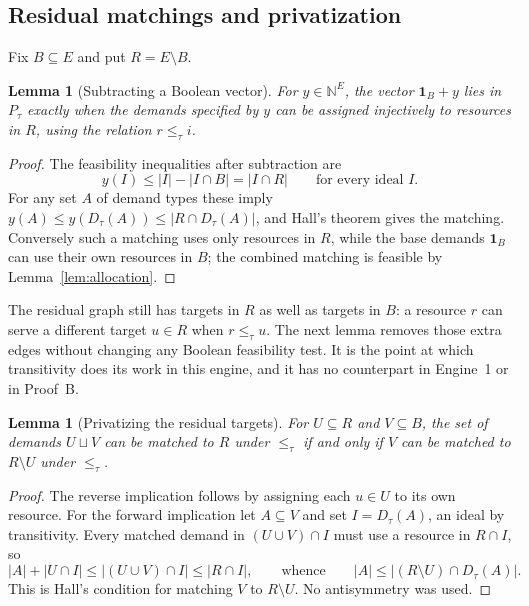\documentclass[11pt]{article}
\numberwithin{equation}{section}
\newtheorem{lemma}[theorem]{Lemma}
\theoremstyle{definition}
\theoremstyle{remark}
\newcommand{\N}{\mathbb N}
\newcommand{\one}{\mathbf 1}
\begin{document}
\subsection{Residual matchings and privatization}

Fix $B\subseteq E$ and put $R=E\setminus B$.

\begin{lemma}[Subtracting a Boolean vector]
\label{lem:residual}
For $y\in\N^E$, the vector $\one_B+y$ lies in $P_\tau$ exactly when the
demands specified by $y$ can be assigned injectively to resources in $R$,
using the relation $r\le_\tau i$.
\end{lemma}

\begin{proof}
The feasibility inequalities after subtraction are
\begin{equation}
 y(I)\le |I|-|I\cap B|=|I\cap R|\qquad\text{for every ideal }I.
 \label{eq:residual-ideal}
\end{equation}
For any set $A$ of demand types these imply
$y(A)\le y(D_\tau(A))\le|R\cap D_\tau(A)|$, and Hall's theorem gives the
matching. Conversely such a matching uses only resources in $R$, while the
base demands $\one_B$ can use their own resources in $B$; the combined
matching is feasible by Lemma~\ref{lem:allocation}.
\end{proof}

The residual graph still has targets in $R$ as well as targets in $B$: a
resource $r$ can serve a different target $u\in R$ when $r\le_\tau u$. The
next lemma removes those extra edges without changing any Boolean feasibility
test. It is the point at which transitivity does its work in this engine, and
it has no counterpart in Engine~1 or in Proof~B.

\begin{lemma}[Privatizing the residual targets]
\label{lem:private}
For $U\subseteq R$ and $V\subseteq B$, the set of demands $U\sqcup V$ can be
matched to $R$ under $\le_\tau$ if and only if $V$ can be matched to
$R\setminus U$ under $\le_\tau$.
\end{lemma}

\begin{proof}
The reverse implication follows by assigning each $u\in U$ to its own
resource. For the forward implication let $A\subseteq V$ and set
$I=D_\tau(A)$, an ideal by transitivity. Every matched demand in
$(U\cup V)\cap I$ must use a resource in $R\cap I$, so
\[
 |A|+|U\cap I|\le|(U\cup V)\cap I|\le|R\cap I|,
 \qquad\text{whence}\qquad
 |A|\le|(R\setminus U)\cap D_\tau(A)| .
\]
This is Hall's condition for matching $V$ to $R\setminus U$. No antisymmetry
was used.
\end{proof}
\end{document}
